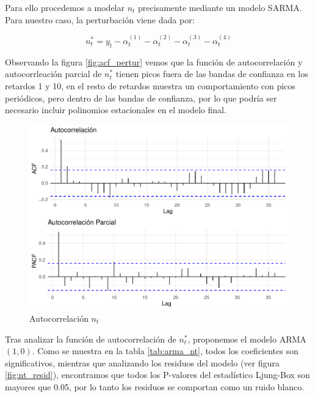 \documentclass[12pt,oneside]{book}\usepackage[]{graphicx}\usepackage[]{color}
\makeatletter
\def\maxwidth{ %
  \ifdim\Gin@nat@width>\linewidth
    \linewidth
  \else
    \Gin@nat@width
  \fi
}
\newenvironment{knitrout}{}{} %
\theoremstyle{definition} %
\makeatother
\begin{document}
Para ello procedemos a modelar $n_t$ precisamente mediante un modelo SARMA. Para nuestro caso, la perturbación viene dada por:

$$n_t^{*} = y_t -  \alpha_t^{(1)}-\alpha_t^{(2)}-\alpha_t^{(3)}-\alpha_t^{(4)}$$

Observando la figura \ref{fig:acf_pertur} vemos que la función de autocorrelación y autocorrleación parcial de $n^{*}_t$ tienen picos fuera de las bandas de confianza en los retardos 1 y 10, en el resto de retardos muestra un comportamiento con picos periódicos, pero dentro de las bandas de confianza, por lo que podría ser necesario incluir polinomios estacionales en el modelo final. 

\begin{knitrout}
\color{fgcolor}\begin{figure}[H]

{\centering \includegraphics[width=\maxwidth]{figure/unnamed-chunk-44-1} 

}

\caption{\label{fig:acf_pertur} Autocorrelación $n_t$ }\label{fig:unnamed-chunk-44}
\end{figure}


\end{knitrout}


Tras analizar la función de autocorrelación de $n_t^{*}$, proponemos el modelo ARMA$(1,0)$. Como se muestra en la tabla \ref{tab:arma_nt}, todos los coeficientes son significativos, mientras que analizando los residuos del modelo (ver figura \ref{fig:nt_resid}), encontramos que todos los P-valores del estadístico Ljung-Box son mayores que 0.05, por lo tanto los residuos se comportan como un ruido blanco.
\end{document}
